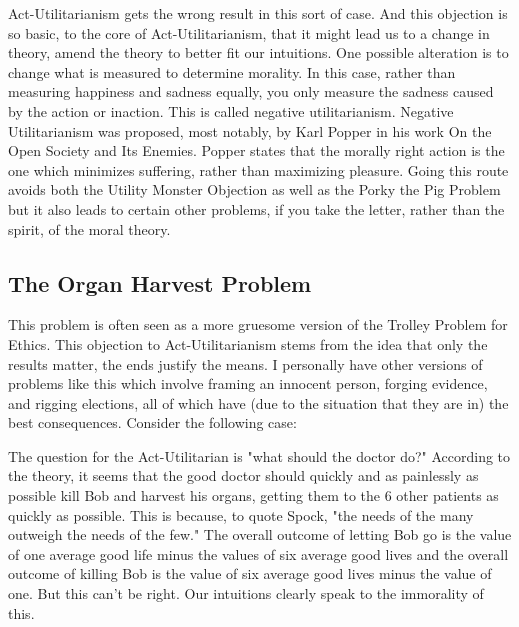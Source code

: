 Act-Utilitarianism gets the wrong result in this sort of case. And this objection is so basic, to the core of Act-Utilitarianism, that it might lead us to a change in theory, amend the theory to better fit our intuitions. One possible alteration is to change what is measured to determine morality. In this case, rather than measuring happiness and sadness equally, you only measure the sadness caused by the action or inaction. This is called negative utilitarianism. Negative Utilitarianism was proposed, most notably, by Karl Popper in his work On the Open Society and Its Enemies. Popper states that the morally right action is the one which minimizes suffering, rather than maximizing pleasure. Going this route avoids both the Utility Monster Objection as well as the Porky the Pig Problem but it also leads to certain other problems, if you take the letter, rather than the spirit, of the moral theory.  

\subsection{The Organ Harvest Problem}

This problem is often seen as a more gruesome version of the Trolley Problem for Ethics. This objection to Act-Utilitarianism stems from the idea that only the results matter, the ends justify the means. I personally have other versions of problems like this which involve framing an innocent person, forging evidence, and rigging elections, all of which have (due to the situation that they are in) the best consequences. Consider the following case:


The question for the Act-Utilitarian is "what should the doctor do?" According to the theory, it seems that the good doctor should quickly and as painlessly as possible kill Bob and harvest his organs, getting them to the 6 other patients as quickly as possible. This is because, to quote Spock, "the needs of the many outweigh the needs of the few." The overall outcome of letting Bob go is the value of one average good life minus the values of six average good lives and the overall outcome of killing Bob is the value of six average good lives minus the value of one. But this can't be right. Our intuitions clearly speak to the immorality of this. 

